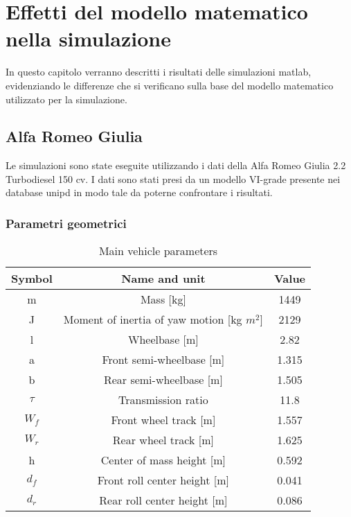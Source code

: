 \chapter{Effetti del modello matematico nella simulazione}
\label{cha:cap4}


In questo capitolo verranno descritti i risultati delle 
simulazioni matlab, evidenziando le differenze che si verificano
sulla base del modello matematico utilizzato per la simulazione.

\section{Alfa Romeo Giulia}
Le simulazioni sono state eseguite utilizzando i dati della 
Alfa Romeo Giulia 2.2 Turbodiesel 150 cv.
I dati sono stati presi da un modello VI-grade presente nei 
database unipd in modo tale da poterne confrontare i risultati.

\subsection{Parametri geometrici}
\begin{table}[H]
    \centering
    \caption{Main vehicle parameters}
    \vspace{0.5em}
    \begin{tabular}{ccc}
    \hline
        Symbol & Name and unit & Value\\
        \hline
        m & Mass [kg] & 1449\\
        J & Moment of inertia of yaw motion [kg $m^2$] & 2129 \\
        l & Wheelbase [m] & 2.82\\
        a & Front semi-wheelbase [m] & 1.315\\
        b & Rear semi-wheelbase [m] & 1.505\\
        $\tau$ & Transmission ratio & 11.8\\
        $W_f$ & Front wheel track [m] & 1.557\\
        $W_r$ & Rear wheel track [m] & 1.625\\
        h & Center of mass height [m] & 0.592\\
        $d_f$ & Front roll center height [m] & 0.041\\
        $d_r$ & Rear roll center height [m] & 0.086\\
    \hline    
    \end{tabular}
    \label{tab:tabella parametri Giulia}
\end{table}

